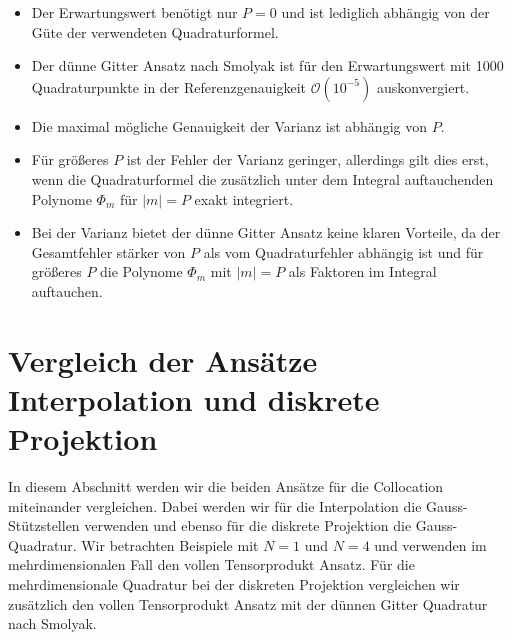 \begin{itemize}
\item Der Erwartungswert benötigt nur $P=0$ und ist lediglich abhängig von der Güte der verwendeten Quadraturformel.
\item Der dünne Gitter Ansatz nach Smolyak ist für den Erwartungswert mit 1000 Quadraturpunkte in der Referenzgenauigkeit $\mathcal{O}(10^{-5})$ auskonvergiert.
\item Die maximal mögliche Genauigkeit der Varianz ist abhängig von $P$. 
\item Für größeres $P$ ist der Fehler der Varianz geringer, allerdings gilt dies erst, wenn die Quadraturformel die zusätzlich unter dem Integral auftauchenden Polynome $\Phi_m$ für $|m|=P$ exakt integriert.
\item Bei der Varianz bietet der dünne Gitter Ansatz keine klaren Vorteile, da der Gesamtfehler stärker von $P$ als vom Quadraturfehler abhängig ist und für größeres $P$ die Polynome $\Phi_m$ mit $|m|=P$ als Faktoren im Integral auftauchen.
\end{itemize} 

\section{Vergleich der Ansätze Interpolation und diskrete Projektion}
In diesem Abschnitt werden wir die beiden Ansätze für die Collocation miteinander vergleichen. Dabei werden wir für die Interpolation die Gauss-Stützstellen verwenden und ebenso für die diskrete Projektion die Gauss-Quadratur. Wir betrachten Beispiele mit $N=1$ und $N=4$ und verwenden im mehrdimensionalen Fall den vollen Tensorprodukt Ansatz. Für die mehrdimensionale Quadratur bei der diskreten Projektion vergleichen wir zusätzlich den vollen Tensorprodukt Ansatz mit der dünnen Gitter Quadratur nach Smolyak.
